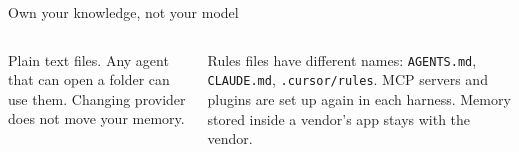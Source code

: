\begin{frame}{Own your knowledge, not your model}
  \begin{columns}[c,onlytextwidth]
      {\small Plain text files. Any agent that can open a folder can use them. Changing provider does not move your memory.\par}
      \vspace{0.55em}
      {\small Rules files have different names: \texttt{AGENTS.md}, \texttt{CLAUDE.md}, \texttt{.cursor/rules}. MCP servers and plugins are set up again in each harness. Memory stored inside a vendor's app stays with the vendor.\par}
  \end{columns}
\end{frame}

